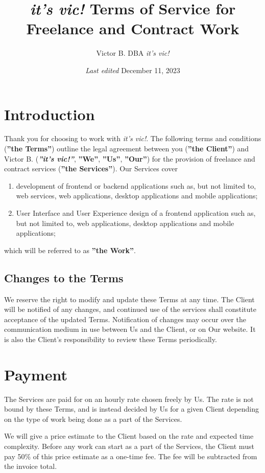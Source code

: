 \documentclass{article}
\title{\textit{it's vic!} Terms of Service for Freelance and Contract Work}
\author{Victor B. DBA \textit{it's vic!}}
\date{\textit{Last edited} December 11, 2023}
\begin{document}
\maketitle
\tableofcontents

\renewcommand{\labelenumi}{\alph{enumi})}

\section{Introduction}
Thank you for choosing to work with \textit{it's vic!}. The following terms and conditions (\textbf{''the Terms''}) outline the legal agreement between you (\textbf{''the Client''}) and Victor B. (\textbf{\textit{''it's vic!''}}, \textbf{''We''}, \textbf{''Us''}, \textbf{''Our''}) for the provision of freelance and contract services (\textbf{''the Services''}). Our Services cover 
\begin{enumerate}
    \item development of frontend or backend applications such as, but not limited to, web services, web applications, desktop applications and mobile applications;
    \item User Interface and User Experience design of a frontend application such as, but not limited to, web applications, desktop applications and mobile applications;
\end{enumerate}
which will be referred to as \textbf{''the Work''}.

\subsection{Changes to the Terms}
We reserve the right to modify and update these Terms at any time. The Client will be notified of any changes, and continued use of the services shall constitute acceptance of the updated Terms. Notification of changes may occur over the communication medium in use between Us and the Client, or on Our website. It is also the Client's responsibility to review these Terms periodically.

\section{Payment}
The Services are paid for on an hourly rate chosen freely by Us. The rate is not bound by these Terms, and is instead decided by Us for a given Client depending on the type of work being done as a part of the Services.

We will give a price estimate to the Client based on the rate and expected time complexity. Before any work can start as a part of the Services, the Client must pay 50\% of this price estimate as a one-time fee. The fee will be subtracted from the invoice total.
\end{document}

